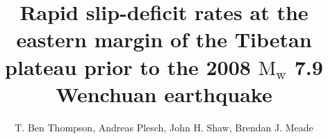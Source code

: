 \documentclass[draft,jgrga]{agutex}
\begin{document}
%
%


\title{Rapid slip-deficit rates at the eastern margin of the Tibetan plateau prior to the 2008 $\textrm{M}_\textrm{w}$ 7.9 Wenchuan earthquake}
%
%

%
%


\author{T. Ben Thompson, Andreas Plesch, John H. Shaw, Brendan J. Meade}








%
%

\end{document}
